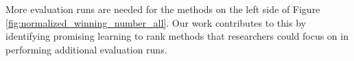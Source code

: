 \documentclass{sig-alternate}
\begin{document}
More evaluation runs are needed for the methods on the left side of Figure \ref{fig:normalized_winning_number_all}. Our work contributes to this by identifying promising learning to rank methods that researchers could focus on in performing additional evaluation runs.\\


%

{\small}  %
%
%
\onecolumn
\clearpage
\newpage
\appendix
\end{document}
